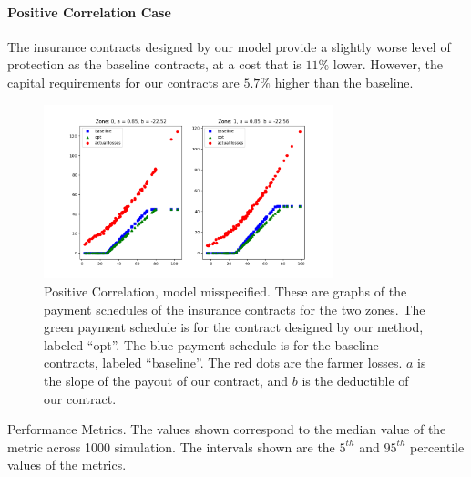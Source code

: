 \documentclass[11pt]{article}
\begin{document}
      \paragraph{Positive Correlation Case} The insurance contracts designed by our model provide a slightly worse level of protection as the baseline contracts, at a cost that is $11\%$ lower. However, the capital requirements for our contracts are $5.7\%$ higher than the baseline. 
      \begin{figure}[H]
          \centering
          \includegraphics[width=0.75\textwidth]{../../output/figures/Bootstrap/pos_corr_nonlinear.png}
          \caption{Positive Correlation, model misspecified. These are graphs of the payment schedules of the insurance contracts for the two zones. The green payment schedule is for the contract designed by our method, labeled ``opt''. The blue payment schedule is for the baseline contracts, labeled ``baseline''. The red dots are the farmer losses. $a$ is the slope of the payout of our contract, and $b$ is the deductible of our contract.}
      \end{figure}

      \begin{table}[H]
          \centering
          
          
          \caption{Performance Metrics. The values shown correspond to the median value of the metric across 1000 simulation. The intervals shown are the $5^{th}$ and $95^{th}$ percentile values of the metrics.}
      \end{table}
      \FloatBarrier
\end{document}
